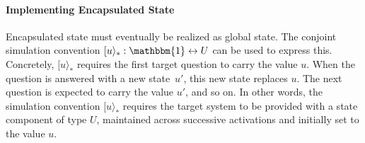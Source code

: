 \documentclass[acmsmall,screen,review,anonymous]{acmart}
\begin{document}
\paragraph{Implementing Encapsulated State} %

Encapsulated state must eventually be realized as global state.
The conjoint simulation convention
$[u\rangle_* : \mathbbm{1} \leftrightarrow U$
can be used to express this.
Concretely, $[u\rangle_*$ requires the first target question
to carry the value $u$.
When the question is answered with a new state~$u'$,
this new state replaces $u$.
The next question is
expected to carry the value $u'$,
and so on.
In other words,
the simulation convention $[u\rangle_*$
requires the target system to be provided with a state component of type $U$,
maintained across successive activations and
initially set to the value $u$.


\end{document}

